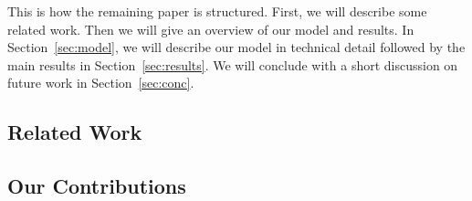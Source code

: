This is how the remaining paper is structured. First, we will describe some related work. Then we will give an overview of our model and results. 
In Section~\ref{sec:model}, we will describe our model in technical detail followed by the main results in Section~\ref{sec:results}. 
We will conclude with a short discussion on future work in Section~\ref{sec:conc}.

\subsection{Related Work}


\subsection{Our Contributions}

